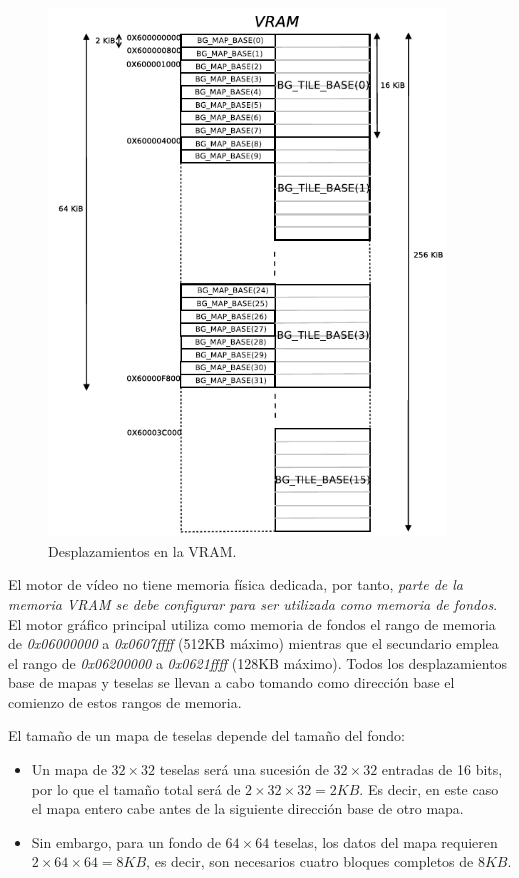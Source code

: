 \begin{figure}[t]
\centering
\includegraphics[height=14cm]{Figuras/C7/c7_mem_teselas.PNG}
\caption{Desplazamientos en la VRAM.}
\label{fig_p2_c3_teselas3}
\end{figure}

El motor de vídeo no tiene memoria física dedicada, por tanto, \textit{parte de la memoria VRAM se debe configurar para ser utilizada como memoria de fondos}. El motor gráfico principal utiliza como memoria de fondos el rango de memoria de \textit{0x06000000} a \textit{0x0607ffff} (512KB máximo) mientras que el secundario emplea el rango de \textit{0x06200000} a \textit{0x0621ffff} (128KB máximo). Todos los desplazamientos base de mapas y teselas se llevan a cabo tomando como dirección base el comienzo de estos rangos de memoria.

El tamaño de un mapa de teselas depende del tamaño del fondo:
\begin{itemize}
\item  Un mapa de $32\times32$ teselas será una sucesión de $32\times32$ entradas de 16 bits, por lo que el tamaño total será de $2\times32\times32 = 2KB$. Es decir, en este caso el mapa entero cabe antes de la siguiente dirección base de otro mapa.
%
\item  Sin embargo, para un fondo de $64\times64$ teselas, los datos del mapa requieren $2\times64\times64 = 8KB$, es decir, son necesarios cuatro bloques completos de $8KB$.
\end{itemize}

